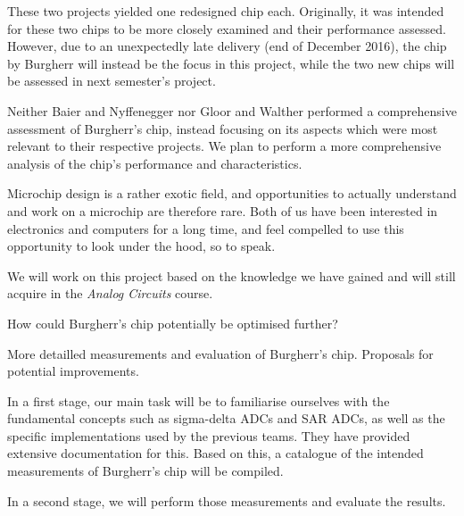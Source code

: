 \documentclass[a4paper,10pt]{article}
\begin{document}
\begin{description}[align=left]
        These two projects  yielded one redesigned chip  each.  Originally, it
        was intended for these two chips to be more closely examined and their
        performance assessed. However,  due to  an unexpectedly  late delivery
        (end of December 2016), the chip by Burgherr will instead be the focus
        in this  project, while  the two  new chips will  be assessed  in next
        semester's project.
    \item[Problem:]
        Neither  Baier  and Nyffenegger  nor  Gloor  and Walther  performed  a
        comprehensive assessment  of Burgherr's chip, instead  focusing on its
        aspects  which were  most  relevant to  their respective  projects. We
        plan  to  perform   a  more  comprehensive  analysis   of  the  chip's
        performance and characteristics.
    \item[Personal Interest:]
        Microchip  design  is a  rather  exotic  field, and  opportunities  to
        actually understand and  work on a microchip  are therefore rare. Both
        of us  have been interested  in electronics  and computers for  a long
        time, and  feel compelled to  use this  opportunity to look  under the
        hood, so to speak.
    \item[Own theoretical position:]
        We will work on this project based on the knowledge we have gained and
        will still acquire in the \emph{Analog Circuits} course.
    \item[Question  $\ne$  Task:] How  could Burgherr's  chip  potentially  be
        optimised further?
    \item[Objectives:]
        More   detailled    measurements   and   evaluation    of   Burgherr's
        chip. Proposals for potential improvements.
    \item[Methodical Approach:]
        In a first stage, our main  task will be to familiarise ourselves with
        the fundamental  concepts such  as sigma-delta ADCs  and SAR  ADCs, as
        well as the specific implementations  used by the previous teams. They
        have  provided  extensive documentation  for  this. Based  on this,  a
        catalogue  of the  intended measurements  of Burgherr's  chip will  be
        compiled.

        In a second stage, we will perform those measurements and evaluate the
        results.


\end{description}
\end{document}
